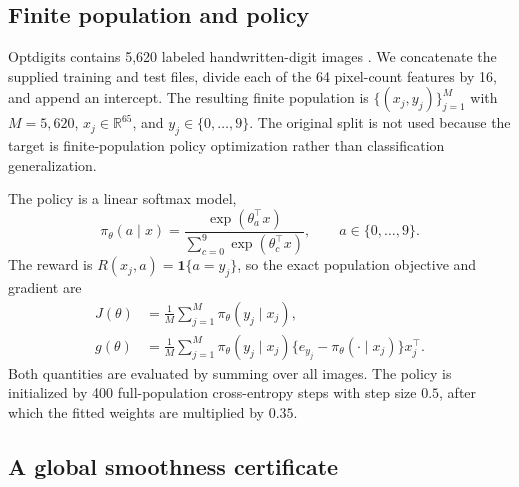 \subsection{Finite population and policy}

Optdigits contains 5,620 labeled handwritten-digit images \citep{alpaydin1998optdigits}. We concatenate the supplied training and test files, divide each of the 64 pixel-count features by 16, and append an intercept. The resulting finite population is $\{(x_j,y_j)\}_{j=1}^M$ with $M=5{,}620$, $x_j\in\mathbb R^{65}$, and $y_j\in\{0,\ldots,9\}$. The original split is not used because the target is finite-population policy optimization rather than classification generalization.

The policy is a linear softmax model,
\begin{equation}
 \pi_\theta(a\mid x)
 =\frac{\exp(\theta_a^\top x)}{\sum_{c=0}^9\exp(\theta_c^\top x)},
 \qquad a\in\{0,\ldots,9\}.
 \label{eq:categorical-policy}
\end{equation}
The reward is $R(x_j,a)=\mathbf 1\{a=y_j\}$, so the exact population objective and gradient are
\begin{align}
 J(\theta)&=\frac1M\sum_{j=1}^M\pi_\theta(y_j\mid x_j),
 \label{eq:categorical-value}\\
 g(\theta)&=\frac1M\sum_{j=1}^M
 \pi_\theta(y_j\mid x_j)
 \{e_{y_j}-\pi_\theta(\cdot\mid x_j)\}x_j^\top.
 \label{eq:categorical-gradient}
\end{align}
Both quantities are evaluated by summing over all images. The policy is initialized by 400 full-population cross-entropy steps with step size $0.5$, after which the fitted weights are multiplied by $0.35$.

\subsection{A global smoothness certificate}
\label{app:optdigits-smoothness}

